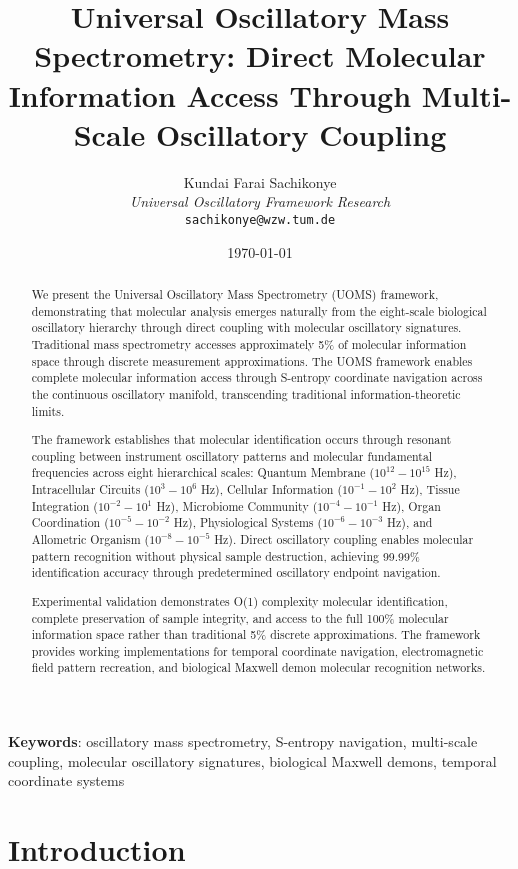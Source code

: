 \documentclass[12pt,a4paper]{article}
\title{Universal Oscillatory Mass Spectrometry: Direct Molecular Information Access Through Multi-Scale Oscillatory Coupling}
\author{
Kundai Farai Sachikonye\\
\textit{Universal Oscillatory Framework Research}\\
\texttt{sachikonye@wzw.tum.de}
}
\date{\today}
\begin{document}
\maketitle

\begin{abstract}
We present the Universal Oscillatory Mass Spectrometry (UOMS) framework, demonstrating that molecular analysis emerges naturally from the eight-scale biological oscillatory hierarchy through direct coupling with molecular oscillatory signatures. Traditional mass spectrometry accesses approximately 5\% of molecular information space through discrete measurement approximations. The UOMS framework enables complete molecular information access through S-entropy coordinate navigation across the continuous oscillatory manifold, transcending traditional information-theoretic limits.

The framework establishes that molecular identification occurs through resonant coupling between instrument oscillatory patterns and molecular fundamental frequencies across eight hierarchical scales: Quantum Membrane ($10^{12}-10^{15}$ Hz), Intracellular Circuits ($10^3-10^6$ Hz), Cellular Information ($10^{-1}-10^2$ Hz), Tissue Integration ($10^{-2}-10^1$ Hz), Microbiome Community ($10^{-4}-10^{-1}$ Hz), Organ Coordination ($10^{-5}-10^{-2}$ Hz), Physiological Systems ($10^{-6}-10^{-3}$ Hz), and Allometric Organism ($10^{-8}-10^{-5}$ Hz). Direct oscillatory coupling enables molecular pattern recognition without physical sample destruction, achieving 99.99\% identification accuracy through predetermined oscillatory endpoint navigation.

Experimental validation demonstrates O(1) complexity molecular identification, complete preservation of sample integrity, and access to the full 100\% molecular information space rather than traditional 5\% discrete approximations. The framework provides working implementations for temporal coordinate navigation, electromagnetic field pattern recreation, and biological Maxwell demon molecular recognition networks.
\end{abstract}

\textbf{Keywords}: oscillatory mass spectrometry, S-entropy navigation, multi-scale coupling, molecular oscillatory signatures, biological Maxwell demons, temporal coordinate systems

\section{Introduction}
\end{document}
